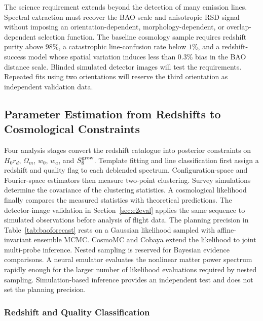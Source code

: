 The science requirement extends beyond the detection of many emission lines. Spectral extraction must recover the BAO scale and anisotropic RSD signal without imposing an orientation-dependent, morphology-dependent, or overlap-dependent selection function. The baseline cosmology sample requires redshift purity above $98\%$, a catastrophic line-confusion rate below $1\%$, and a redshift-success model whose spatial variation induces less than $0.3\%$ bias in the BAO distance scale. Blinded simulated detector images will test the requirements. Repeated fits using two orientations will reserve the third orientation as independent validation data.

\subsection{Parameter Estimation from Redshifts to Cosmological Constraints}

Four analysis stages convert the redshift catalogue into posterior constraints on $H_0r_d$, $\Omega_m$, $w_0$, $w_a$, and $S_8^{\rm grow}$. Template fitting and line classification first assign a redshift and quality flag to each deblended spectrum. Configuration-space and Fourier-space estimators then measure two-point clustering. Survey simulations determine the covariance of the clustering statistics. A cosmological likelihood finally compares the measured statistics with theoretical predictions. The detector-image validation in Section~\ref{sec:e2eval} applies the same sequence to simulated observations before analysis of flight data. The planning precision in Table~\ref{tab:baoforecast} rests on a Gaussian likelihood sampled with affine-invariant ensemble MCMC. CosmoMC and Cobaya extend the likelihood to joint multi-probe inference. Nested sampling is reserved for Bayesian evidence comparisons. A neural emulator evaluates the nonlinear matter power spectrum rapidly enough for the larger number of likelihood evaluations required by nested sampling. Simulation-based inference provides an independent test and does not set the planning precision.

\subsubsection{Redshift and Quality Classification}

